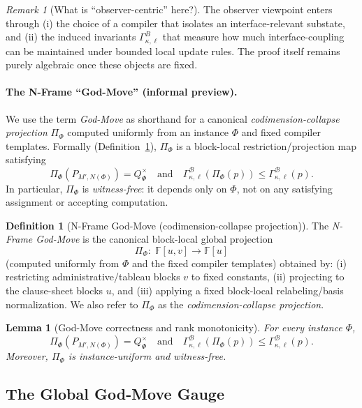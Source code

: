 \documentclass[12pt]{article}
\newtheorem{lemma}[theorem]{Lemma}
\theoremstyle{definition}
\newtheorem{definition}{Definition}
\theoremstyle{definition}
\theoremstyle{remark}
\newtheorem{remark}{Remark}
\theoremstyle{remark}
\begin{document}
\begin{remark}[What is ``observer-centric'' here?]
The observer viewpoint enters through (i) the choice of a compiler that isolates
an interface-relevant substate, and (ii) the induced invariants $\Gamma^{B}_{\kappa,\ell}$
that measure how much interface-coupling can be maintained under bounded local
update rules.  The proof itself remains purely algebraic once these objects are fixed.
\end{remark}

\paragraph{The N-Frame ``God-Move'' (informal preview).}
We use the term \emph{God-Move} as shorthand for a canonical
\emph{codimension-collapse projection} $\Pi_\Phi$ computed uniformly from an
instance $\Phi$ and fixed compiler templates. Formally (Definition~\ref{def:god-move}),
$\Pi_\Phi$ is a block-local restriction/projection map satisfying
\[
\Pi_\Phi(P_{M',N(\Phi)}) = Q^{\times}_\Phi
\quad\text{and}\quad
\Gamma^{\mathcal{B}}_{\kappa,\ell}(\Pi_\Phi(p)) \le \Gamma^{\mathcal{B}}_{\kappa,\ell}(p).
\]
In particular, $\Pi_\Phi$ is \emph{witness-free}: it depends only on $\Phi$,
not on any satisfying assignment or accepting computation.

\begin{definition}[N-Frame God-Move (codimension-collapse projection)]
\label{def:god-move}
The \emph{N-Frame God-Move} is the canonical block-local global projection
\[
\Pi_\Phi:\; \mathbb{F}[u,v] \to \mathbb{F}[u]
\]
(computed uniformly from $\Phi$ and the fixed compiler templates) obtained by:
(i) restricting administrative/tableau blocks $v$ to fixed constants,
(ii) projecting to the clause-sheet blocks $u$, and
(iii) applying a fixed block-local relabeling/basis normalization.
We also refer to $\Pi_\Phi$ as the \emph{codimension-collapse projection}.
\end{definition}

\begin{lemma}[God-Move correctness and rank monotonicity]
\label{lem:god-move-properties}
For every instance $\Phi$,
\[
\Pi_\Phi(P_{M',N(\Phi)}) = Q^{\times}_\Phi
\quad\text{and}\quad
\Gamma^{\mathcal{B}}_{\kappa,\ell}(\Pi_\Phi(p)) \le \Gamma^{\mathcal{B}}_{\kappa,\ell}(p).
\]
Moreover, $\Pi_\Phi$ is instance-uniform and witness-free.
\end{lemma}

\subsection*{The Global God-Move Gauge}
\end{document}
